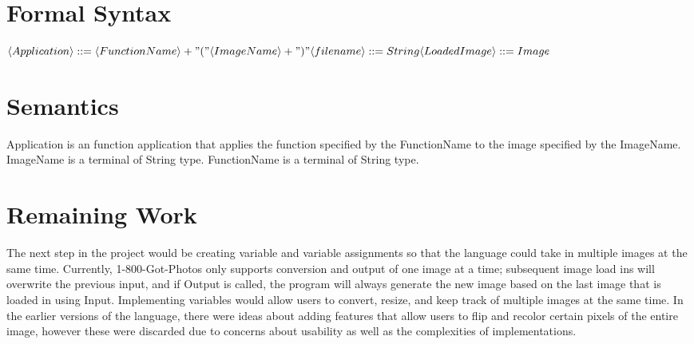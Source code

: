 \documentclass{article}
\begin{document}
\section{Formal Syntax}

$
\langle Application \rangle ::= \langle FunctionName \rangle + "(" \langle ImageName \rangle + ")" \\
\\ \langle filename \rangle ::= String
\\ \langle LoadedImage \rangle ::= Image
$

\section{Semantics}

Application is an function application that applies the function specified by the FunctionName to the image specified by the ImageName. 
ImageName is a terminal of String type. 
FunctionName is a terminal of String type. 

\section{Remaining Work}
The next step in the project would be creating variable and variable assignments so that the language could take in multiple images at the same time. Currently, 1-800-Got-Photos only supports conversion and output of one image at a time; subsequent image load ins will overwrite the previous input, and if Output is called, the program will always generate the new image based on the last image that is loaded in using Input. Implementing variables would allow users to convert, resize, and keep track of multiple images at the same time. In the earlier versions of the language, there were ideas about adding features that allow users to flip and recolor certain pixels of the entire image, however these were discarded due to concerns about usability as well as the complexities of implementations. 
\end{document}

